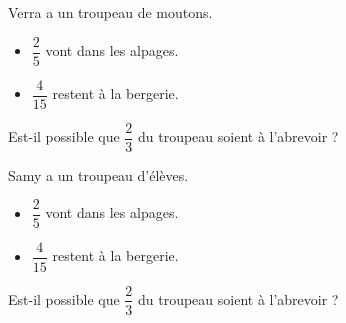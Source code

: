 \begin{minipage}[t]{0.45\textwidth}

Verra a un troupeau de moutons. 
\begin{itemize}
    \item $\dfrac{2}{5}$ vont dans les alpages.
    \item $\dfrac{4}{15}$ restent à la bergerie.
\end{itemize}
Est-il possible que $ \dfrac{2}{3}$ du troupeau soient à l'abrevoir ?
\end{minipage}
\hfil
\vrule
\hfil
\begin{minipage}[t]{0.45\textwidth}

Samy a un troupeau d'élèves. 
\begin{itemize}
    \item $\dfrac{2}{5}$ vont dans les alpages.
    \item $\dfrac{4}{15}$ restent à la bergerie.
\end{itemize}
Est-il possible que $ \dfrac{2}{3}$ du troupeau soient à l'abrevoir ?
\end{minipage}